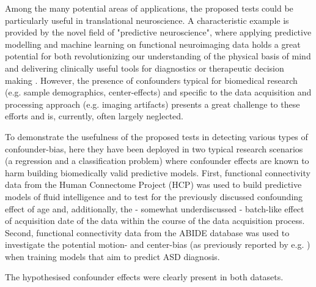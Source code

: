 \documentclass{article}
\begin{document}
Among the many potential areas of applications, the proposed tests could be particularly useful in translational neuroscience. A characteristic example is provided by the novel field of "predictive neuroscience", where applying predictive modelling and machine learning on functional neuroimaging data holds a great potential for both revolutionizing our understanding of the physical basis of mind and delivering clinically useful tools for diagnostics or therapeutic decision making \citep{woo2017building, wager2013fmri, spisak2020pain}. However, the presence of confounders typical for biomedical research (e.g. sample demographics, center-effects) and specific to the data acquisition and processing approach (e.g. imaging artifacts) presents a great challenge to these efforts and is, currently, often largely neglected.

To demonstrate the usefulness of the proposed tests in detecting various types of confounder-bias, here they have been deployed in two typical research scenarios (a regression and a classification problem) where confounder effects are known to harm building biomedically valid predictive models. 
First, functional connectivity data from the Human Connectome Project (HCP) \citep{van2013wu} was used to build predictive models of fluid intelligence and to test for the previously discussed confounding effect of age \citep{lohmann2021predicting, dubois2018distributed} and,  additionally, the - somewhat underdiscussed - batch-like effect of acquisition date of the data within the course of the data acquisition process.
Second, functional connectivity data from the ABIDE \citep{di2014autism} database was used to investigate the potential motion- and center-bias (as previously reported by e.g. \cite{spisak2014voxel, spisak2019optimal, gotts2013perils}) when training models that aim to predict ASD diagnosis.

The hypothesised confounder effects were clearly present in both datasets.
\end{document}
